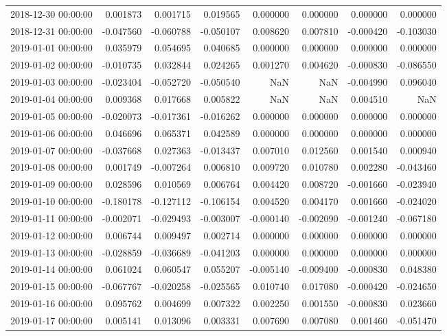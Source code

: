 \begin{tabular}{lrrrrrrr}
2018-12-30 00:00:00 & 0.001873 & 0.001715 & 0.019565 & 0.000000 & 0.000000 & 0.000000 & 0.000000 \\
2018-12-31 00:00:00 & -0.047560 & -0.060788 & -0.050107 & 0.008620 & 0.007810 & -0.000420 & -0.103030 \\
2019-01-01 00:00:00 & 0.035979 & 0.054695 & 0.040685 & 0.000000 & 0.000000 & 0.000000 & 0.000000 \\
2019-01-02 00:00:00 & -0.010735 & 0.032844 & 0.024265 & 0.001270 & 0.004620 & -0.000830 & -0.086550 \\
2019-01-03 00:00:00 & -0.023404 & -0.052720 & -0.050540 & NaN & NaN & -0.004990 & 0.096040 \\
2019-01-04 00:00:00 & 0.009368 & 0.017668 & 0.005822 & NaN & NaN & 0.004510 & NaN \\
2019-01-05 00:00:00 & -0.020073 & -0.017361 & -0.016262 & 0.000000 & 0.000000 & 0.000000 & 0.000000 \\
2019-01-06 00:00:00 & 0.046696 & 0.065371 & 0.042589 & 0.000000 & 0.000000 & 0.000000 & 0.000000 \\
2019-01-07 00:00:00 & -0.037668 & 0.027363 & -0.013437 & 0.007010 & 0.012560 & 0.001540 & 0.000940 \\
2019-01-08 00:00:00 & 0.001749 & -0.007264 & 0.006810 & 0.009720 & 0.010780 & 0.002280 & -0.043460 \\
2019-01-09 00:00:00 & 0.028596 & 0.010569 & 0.006764 & 0.004420 & 0.008720 & -0.001660 & -0.023940 \\
2019-01-10 00:00:00 & -0.180178 & -0.127112 & -0.106154 & 0.004520 & 0.004170 & 0.001660 & -0.024020 \\
2019-01-11 00:00:00 & -0.002071 & -0.029493 & -0.003007 & -0.000140 & -0.002090 & -0.001240 & -0.067180 \\
2019-01-12 00:00:00 & 0.006744 & 0.009497 & 0.002714 & 0.000000 & 0.000000 & 0.000000 & 0.000000 \\
2019-01-13 00:00:00 & -0.028859 & -0.036689 & -0.041203 & 0.000000 & 0.000000 & 0.000000 & 0.000000 \\
2019-01-14 00:00:00 & 0.061024 & 0.060547 & 0.055207 & -0.005140 & -0.009400 & -0.000830 & 0.048380 \\
2019-01-15 00:00:00 & -0.067767 & -0.020258 & -0.025565 & 0.010740 & 0.017080 & -0.000420 & -0.024650 \\
2019-01-16 00:00:00 & 0.095762 & 0.004699 & 0.007322 & 0.002250 & 0.001550 & -0.000830 & 0.023660 \\
2019-01-17 00:00:00 & 0.005141 & 0.013096 & 0.003331 & 0.007690 & 0.007080 & 0.001460 & -0.051470 \\

\end{tabular}
